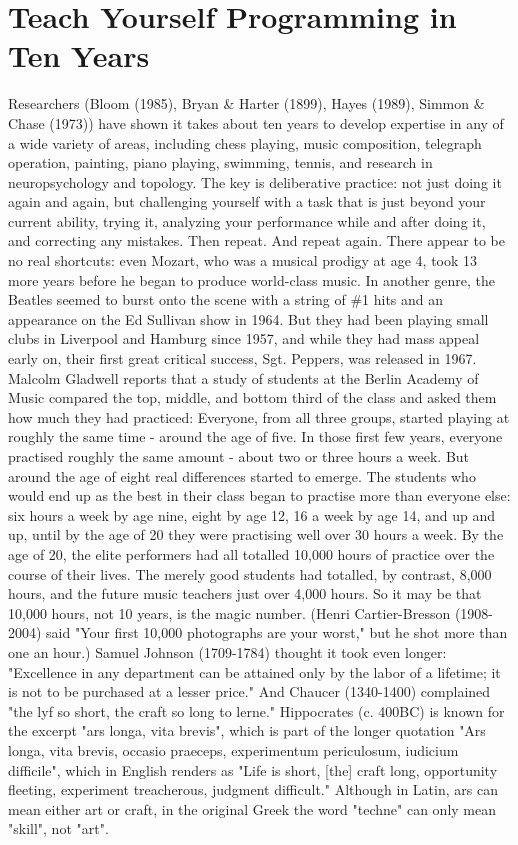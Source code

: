 \documentclass[12pt,a4paper,final,twoside,onecolumn,titlepage]{book}
\begin{document}
\section{Teach Yourself Programming in Ten Years}
Researchers (Bloom (1985), Bryan \& Harter (1899), Hayes (1989), Simmon \& Chase (1973)) have shown it takes about ten years to develop expertise in any of a wide variety of areas, including chess playing, music composition, telegraph operation, painting, piano playing, swimming, tennis, and research in neuropsychology and topology. The key is deliberative practice: not just doing it again and again, but challenging yourself with a task that is just beyond your current ability, trying it, analyzing your performance while and after doing it, and correcting any mistakes. Then repeat. And repeat again. There appear to be no real shortcuts: even Mozart, who was a musical prodigy at age 4, took 13 more years before he began to produce world-class music. In another genre, the Beatles seemed to burst onto the scene with a string of \#1 hits and an appearance on the Ed Sullivan show in 1964. But they had been playing small clubs in Liverpool and Hamburg since 1957, and while they had mass appeal early on, their first great critical success, Sgt. Peppers, was released in 1967. Malcolm Gladwell reports that a study of students at the Berlin Academy of Music compared the top, middle, and bottom third of the class and asked them how much they had practiced:
Everyone, from all three groups, started playing at roughly the same time - around the age of five. In those first few years, everyone practised roughly the same amount - about two or three hours a week. But around the age of eight real differences started to emerge. The students who would end up as the best in their class began to practise more than everyone else: six hours a week by age nine, eight by age 12, 16 a week by age 14, and up and up, until by the age of 20 they were practising well over 30 hours a week. By the age of 20, the elite performers had all totalled 10,000 hours of practice over the course of their lives. The merely good students had totalled, by contrast, 8,000 hours, and the future music teachers just over 4,000 hours.
So it may be that 10,000 hours, not 10 years, is the magic number. (Henri Cartier-Bresson (1908-2004) said "Your first 10,000 photographs are your worst," but he shot more than one an hour.) Samuel Johnson (1709-1784) thought it took even longer: "Excellence in any department can be attained only by the labor of a lifetime; it is not to be purchased at a lesser price." And Chaucer (1340-1400) complained "the lyf so short, the craft so long to lerne." Hippocrates (c. 400BC) is known for the excerpt "ars longa, vita brevis", which is part of the longer quotation "Ars longa, vita brevis, occasio praeceps, experimentum periculosum, iudicium difficile", which in English renders as "Life is short, [the] craft long, opportunity fleeting, experiment treacherous, judgment difficult." Although in Latin, ars can mean either art or craft, in the original Greek the word "techne" can only mean "skill", not "art".
\end{document}
